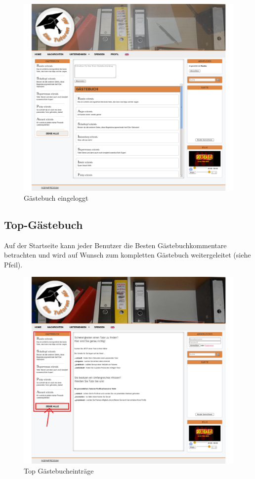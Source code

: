 \begin{figure}[!htbp]
\centering
\includegraphics[width=1\linewidth]{../Screenshots/de/Gaestebuch_logged_in}
\caption{Gästebuch eingeloggt}
\label{fig:Gaestebuch_logged_in}
\end{figure}


\newpage

\subsection{Top-Gästebuch}

Auf der Startseite kann jeder Benutzer die Besten Gästebuchkommentare betrachten und wird auf Wunsch zum kompletten Gästebuch weitergeleitet (siehe Pfeil).

\begin{figure}[!htbp]
\centering
\includegraphics[width=1\linewidth]{../Screenshots/de/TopGaestebuch}
\caption{Top Gästebucheinträge}
\label{fig:TopGaestebuch}
\end{figure}
